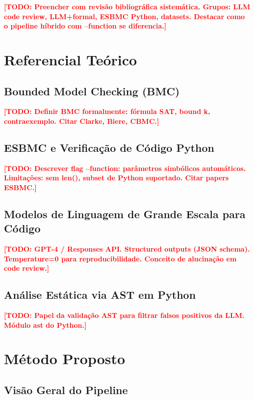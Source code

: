 \documentclass[conference]{IEEEtran}
\newcommand{\todo}[1]{\textcolor{red}{\textbf{[TODO: #1]}}}
\begin{document}
\todo{Preencher com revisão bibliográfica sistemática.
      Grupos: LLM code review, LLM+formal, ESBMC Python, datasets.
      Destacar como o pipeline híbrido com --function se diferencia.}

\section{Referencial Teórico}
\label{sec:referencial}

\subsection{Bounded Model Checking (BMC)}
\todo{Definir BMC formalmente: fórmula SAT, bound k, contraexemplo.
      Citar Clarke, Biere, CBMC.}

\subsection{ESBMC e Verificação de Código Python}
\todo{Descrever flag --function: parâmetros simbólicos automáticos.
      Limitações: sem len(), subset de Python suportado.
      Citar papers ESBMC.}

\subsection{Modelos de Linguagem de Grande Escala para Código}
\todo{GPT-4 / Responses API. Structured outputs (JSON schema).
      Temperature=0 para reproducibilidade.
      Conceito de alucinação em code review.}

\subsection{Análise Estática via AST em Python}
\todo{Papel da validação AST para filtrar falsos positivos da LLM.
      Módulo ast do Python.}

\section{Método Proposto}
\label{sec:metodo}


\subsection{Visão Geral do Pipeline}
\end{document}
